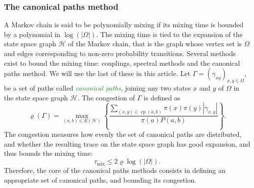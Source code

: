 \documentclass[11pt,a4paper]{article}
\theoremstyle{definition}
\DeclareMathOperator{\cp}{cp}
\DeclareMathOperator{\mix}{mix}
\newcommand{\defin}[1]{\emph{\textcolor{ForestGreen}{#1}}}
\begin{document}
\subsubsection*{The canonical paths method}
A Markov chain is said to be polynomially mixing if its mixing time is bounded
by a polynomial in $\log(|\Omega|)$.  The mixing time is tied to the expansion of
the state space graph $\mathcal H$ of the Markov chain, that is the graph whose vertex set is
$\Omega$ and edges corresponding to non-zero probability transitions. Several
methods exist to bound the mixing time: couplings, spectral methods and the
canonical paths method. We will use the last of these in this article. Let
$\Gamma=(\gamma_{xy})_{x,y\in \Omega}$, be a set of paths called
\defin{canonical paths}, joining any two states $x$ and $y$ of $\Omega$ in the
 state space graph $\mathcal H$. The congestion of $\Gamma$ is defined as
$$\varrho(\Gamma) = \max_{(a,b) \in E(\mathcal H)} \left\{\frac{\sum\limits_{(x,y)\in
      \cp(a,b)} \pi(x)\pi(y)|\gamma_{x,y}|}{\pi(a) P(a,b)}\right\}.$$ The
congestion measures how evenly the set of canonical paths are distributed, and
whether the resulting trace on the state space graph has good expansion, and thus
bounds the mixing time: $$\tau_{\mix} \le 2\varrho\log(|\Omega|).$$ Therefore, the
core of the canonical paths methods consists in defining an appropriate set of
canonical paths, and bounding its congestion.
\end{document}
